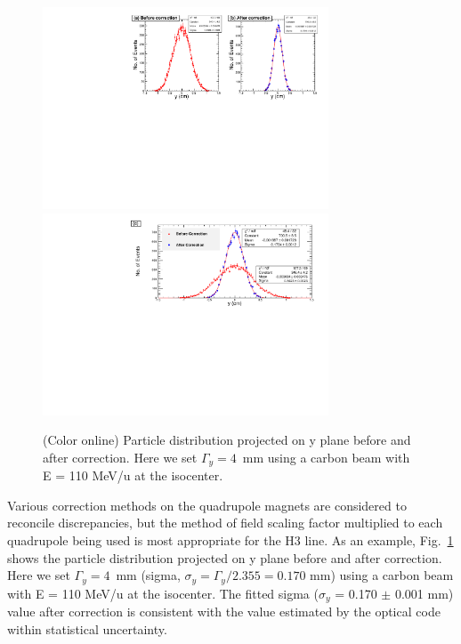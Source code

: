 \documentclass[jkps,preprint,fleqn,showpacs,showkeys,10pt,twocolumn]{revtex4}
\begin{document}
\begin{figure}[h]
  \begin{center}
    \includegraphics[width=8.5cm]{Fig08-1.pdf}
    \includegraphics[width=8.5cm]{Fig08-2.pdf}        
    \caption{(Color online) Particle distribution projected on y plane before and after correction.
      Here we set $\Gamma_{y} = 4$~mm using a carbon beam with E = 110 MeV/u at the isocenter.}
    \label{fig7}
  \end{center}
\end{figure}
Various correction methods on the quadrupole magnets are considered to reconcile discrepancies,
but the method of field scaling factor multiplied to each quadrupole being used is most appropriate for the H3 line.
As an example, Fig.~\ref{fig7} shows the particle distribution projected on y plane before and after correction.
Here we set $\Gamma_{y} = 4$~mm (sigma, $\sigma_{y} = \Gamma_{y}/2.355 = 0.170$ mm) using a carbon beam with E = 110 MeV/u at the isocenter.
The fitted sigma ($\sigma_{y}$ = 0.170 $\pm$ 0.001 mm) value after correction is consistent with the value estimated
by the optical code within statistical uncertainty.
\end{document}
